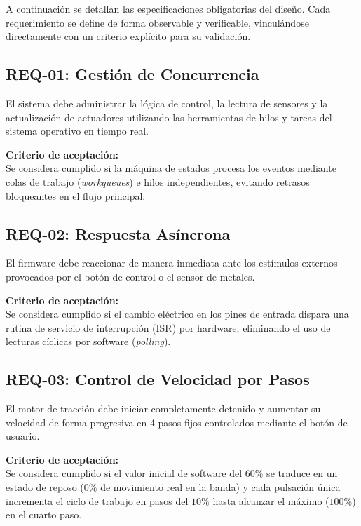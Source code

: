 \documentclass[12pt, letterpaper]{article}
\begin{document}
A continuación se detallan las especificaciones obligatorias del diseño. Cada requerimiento se define de forma observable y verificable, vinculándose directamente con un criterio explícito para su validación.

\subsection{REQ-01: Gestión de Concurrencia}
El sistema debe administrar la lógica de control, la lectura de sensores y la actualización de actuadores utilizando las herramientas de hilos y tareas del sistema operativo en tiempo real.

\vspace{0.5cm}

\noindent \textbf{Criterio de aceptación:} \\
Se considera cumplido si la máquina de estados procesa los eventos mediante colas de trabajo (\textit{workqueues}) e hilos independientes, evitando retrasos bloqueantes en el flujo principal.

\subsection{REQ-02: Respuesta Asíncrona}
El firmware debe reaccionar de manera inmediata ante los estímulos externos provocados por el botón de control o el sensor de metales.

\vspace{0.5cm}

\noindent \textbf{Criterio de aceptación:} \\
Se considera cumplido si el cambio eléctrico en los pines de entrada dispara una rutina de servicio de interrupción (ISR) por hardware, eliminando el uso de lecturas cíclicas por software (\textit{polling}).

\subsection{REQ-03: Control de Velocidad por Pasos}
El motor de tracción debe iniciar completamente detenido y aumentar su velocidad de forma progresiva en 4 pasos fijos controlados mediante el botón de usuario.

\vspace{0.5cm}

\noindent \textbf{Criterio de aceptación:} \\
Se considera cumplido si el valor inicial de software del $60\%$ se traduce en un estado de reposo ($0\%$ de movimiento real en la banda) y cada pulsación única incrementa el ciclo de trabajo en pasos del $10\%$ hasta alcanzar el máximo ($100\%$) en el cuarto paso.
\end{document}
